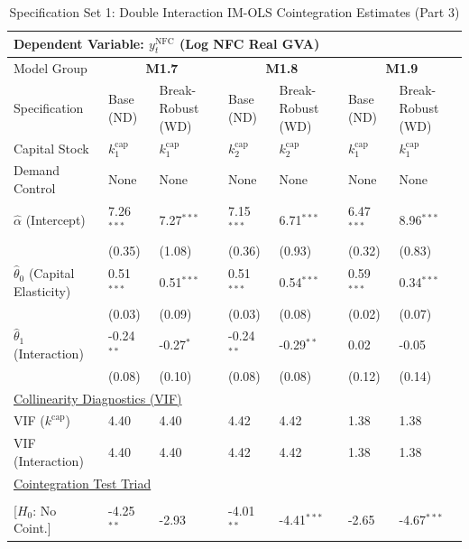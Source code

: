 \begin{table}[H]
\centering
\caption{Specification Set 1: Double Interaction IM-OLS Cointegration Estimates (Part 3)}
\label{tab:spec_set_1_p3}
\scriptsize
\begin{tabular}{p{3.8cm}p{2.1cm}p{2.1cm}p{2.1cm}p{2.1cm}p{2.1cm}p{2.1cm}}
\toprule
\multicolumn{7}{l}{\textbf{Dependent Variable: $y_t^{\text{NFC}}$ (Log NFC Real GVA)}} \\
\midrule
Model Group & \multicolumn{2}{c}{\textbf{M1.7}} & \multicolumn{2}{c}{\textbf{M1.8}} & \multicolumn{2}{c}{\textbf{M1.9}}  \\
Specification & Base (ND) & Break-Robust (WD) & Base (ND) & Break-Robust (WD) & Base (ND) & Break-Robust (WD)  \\
Capital Stock & $k^{\text{cap}}_1$ & $k^{\text{cap}}_1$ & $k^{\text{cap}}_2$ & $k^{\text{cap}}_2$ & $k^{\text{cap}}_1$ & $k^{\text{cap}}_1$  \\
Demand Control & None & None & None & None & None & None  \\
\midrule
$\hat{\alpha}$ (Intercept)  & 7.26$^{***}$ & 7.27$^{***}$ & 7.15$^{***}$ & 6.71$^{***}$ & 6.47$^{***}$ & 8.96$^{***}$  \\
 & {\scriptsize (0.35)} & {\scriptsize (1.08)} & {\scriptsize (0.36)} & {\scriptsize (0.93)} & {\scriptsize (0.32)} & {\scriptsize (0.83)}  \\
[1ex]
$\hat{\theta}_0$ (Capital Elasticity)  & 0.51$^{***}$ & 0.51$^{***}$ & 0.51$^{***}$ & 0.54$^{***}$ & 0.59$^{***}$ & 0.34$^{***}$  \\
 & {\scriptsize (0.03)} & {\scriptsize (0.09)} & {\scriptsize (0.03)} & {\scriptsize (0.08)} & {\scriptsize (0.02)} & {\scriptsize (0.07)}  \\
$\hat{\theta}_1$ (Interaction)  & -0.24$^{**}$ & -0.27$^{*}$ & -0.24$^{**}$ & -0.29$^{**}$ & 0.02 & -0.05  \\
 & {\scriptsize (0.08)} & {\scriptsize (0.10)} & {\scriptsize (0.08)} & {\scriptsize (0.08)} & {\scriptsize (0.12)} & {\scriptsize (0.14)}  \\
\midrule
\multicolumn{7}{l}{\underline{Collinearity Diagnostics (VIF)}} \\
VIF ($k^{\text{cap}}$) & 4.40 & 4.40 & 4.42 & 4.42 & 1.38 & 1.38  \\
VIF (Interaction) & 4.40 & 4.40 & 4.42 & 4.42 & 1.38 & 1.38  \\
\midrule
\multicolumn{7}{l}{\underline{Cointegration Test Triad}} \\
\makecell[l]{Resid. ADF ($t_{\text{ADF}}$) \\ {\scriptsize [$H_0$: No Coint.]}} & -4.25$^{**}$ & -2.93 & -4.01$^{**}$ & -4.41$^{***}$ & -2.65 & -4.67$^{***}$  \\

\end{tabular}
\end{table}
